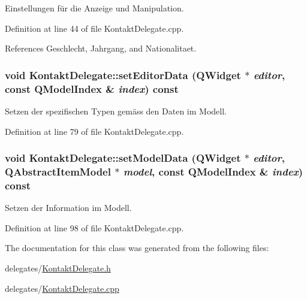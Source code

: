 Einstellungen für die Anzeige und Manipulation. 



Definition at line 44 of file KontaktDelegate.cpp.

References Geschlecht, Jahrgang, and Nationalitaet.\hypertarget{class_kontakt_delegate_096ab170a084ce50b893f03e0697b0d6}{
\subsubsection[setEditorData]{\setlength{\rightskip}{0pt plus 5cm}void KontaktDelegate::setEditorData (QWidget $\ast$ {\em editor}, \/  const QModelIndex \& {\em index}) const}}
\label{class_kontakt_delegate_096ab170a084ce50b893f03e0697b0d6}


Setzen der spezifischen Typen gemäss den Daten im Modell. 



Definition at line 79 of file KontaktDelegate.cpp.\hypertarget{class_kontakt_delegate_fbf3a18d00f43bb3a9050721bc21426e}{
\subsubsection[setModelData]{\setlength{\rightskip}{0pt plus 5cm}void KontaktDelegate::setModelData (QWidget $\ast$ {\em editor}, \/  QAbstractItemModel $\ast$ {\em model}, \/  const QModelIndex \& {\em index}) const}}
\label{class_kontakt_delegate_fbf3a18d00f43bb3a9050721bc21426e}


Setzen der Information im Modell. 



Definition at line 98 of file KontaktDelegate.cpp.

The documentation for this class was generated from the following files:\begin{CompactItemize}
\item 
delegates/\hyperlink{_kontakt_delegate_8h}{KontaktDelegate.h}\item 
delegates/\hyperlink{_kontakt_delegate_8cpp}{KontaktDelegate.cpp}\end{CompactItemize}
